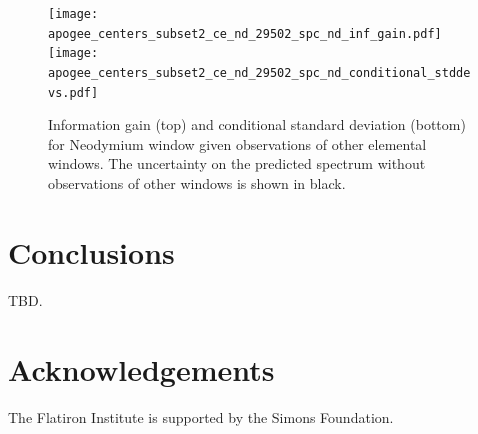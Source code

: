 \documentclass[a4paper,fleqn,usenatbib]{mnras}
\begin{document}
\begin{figure}
	\texttt{[image: apogee\_centers\_subset2\_ce\_nd\_29502\_spc\_nd\_inf\_gain.pdf]}
	\texttt{[image: apogee\_centers\_subset2\_ce\_nd\_29502\_spc\_nd\_conditional\_stddevs.pdf]}
    \caption{Information gain (top) and conditional standard deviation (bottom) for Neodymium window given observations of other elemental windows. The uncertainty on the predicted spectrum without observations of other windows is shown in black.}
    \label{fig:nd_information}
\end{figure}




\section{Conclusions}

TBD.


\section*{Acknowledgements}

The Flatiron Institute is supported by the Simons Foundation.


%



\bsp	%
\label{lastpage}
\end{document}
